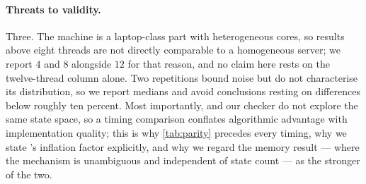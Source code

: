 \paragraph*{Threats to validity.}
Three. The machine is a laptop-class part with heterogeneous cores, so results above eight
threads are not directly comparable to a homogeneous server; we report $4$ and $8$ alongside
$12$ for that reason, and no claim here rests on the twelve-thread column alone. Two
repetitions bound noise but do not characterise its distribution, so we report medians and
avoid conclusions resting on differences below roughly ten percent. Most importantly,
\ltsmin{} and our checker do not explore the same state space, so a timing comparison
conflates algorithmic advantage with implementation quality; this is why \cref{tab:parity}
precedes every timing, why we state \ltsmin{}'s inflation factor explicitly, and why we regard
the memory result --- where the mechanism is unambiguous and independent of state count --- as
the stronger of the two.
